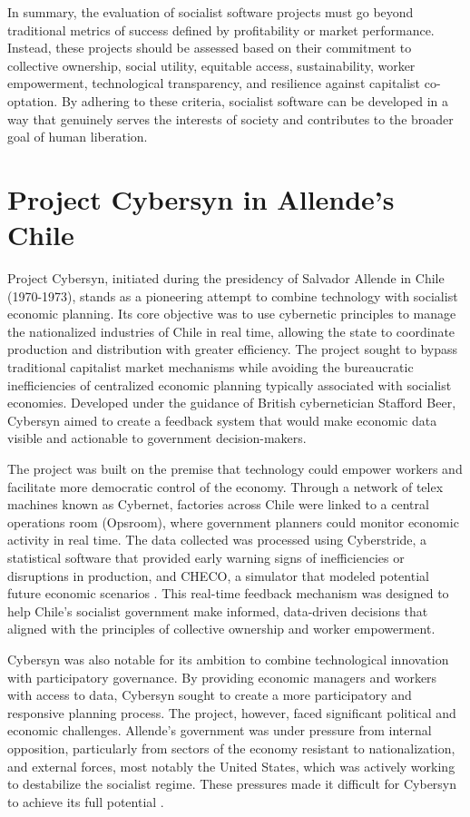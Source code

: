 \begin{refsection}
In summary, the evaluation of socialist software projects must go beyond traditional metrics of success defined by profitability or market performance. Instead, these projects should be assessed based on their commitment to collective ownership, social utility, equitable access, sustainability, worker empowerment, technological transparency, and resilience against capitalist co-optation. By adhering to these criteria, socialist software can be developed in a way that genuinely serves the interests of society and contributes to the broader goal of human liberation.

\section{Project Cybersyn in Allende's Chile}

Project Cybersyn, initiated during the presidency of Salvador Allende in Chile (1970-1973), stands as a pioneering attempt to combine technology with socialist economic planning. Its core objective was to use cybernetic principles to manage the nationalized industries of Chile in real time, allowing the state to coordinate production and distribution with greater efficiency. The project sought to bypass traditional capitalist market mechanisms while avoiding the bureaucratic inefficiencies of centralized economic planning typically associated with socialist economies. Developed under the guidance of British cybernetician Stafford Beer, Cybersyn aimed to create a feedback system that would make economic data visible and actionable to government decision-makers.

The project was built on the premise that technology could empower workers and facilitate more democratic control of the economy. Through a network of telex machines known as Cybernet, factories across Chile were linked to a central operations room (Opsroom), where government planners could monitor economic activity in real time. The data collected was processed using Cyberstride, a statistical software that provided early warning signs of inefficiencies or disruptions in production, and CHECO, a simulator that modeled potential future economic scenarios \cite[pp.~26-29]{medina2014}. This real-time feedback mechanism was designed to help Chile's socialist government make informed, data-driven decisions that aligned with the principles of collective ownership and worker empowerment.

Cybersyn was also notable for its ambition to combine technological innovation with participatory governance. By providing economic managers and workers with access to data, Cybersyn sought to create a more participatory and responsive planning process. The project, however, faced significant political and economic challenges. Allende's government was under pressure from internal opposition, particularly from sectors of the economy resistant to nationalization, and external forces, most notably the United States, which was actively working to destabilize the socialist regime. These pressures made it difficult for Cybersyn to achieve its full potential \cite[pp.~154-155]{harmer}.


\end{refsection}
